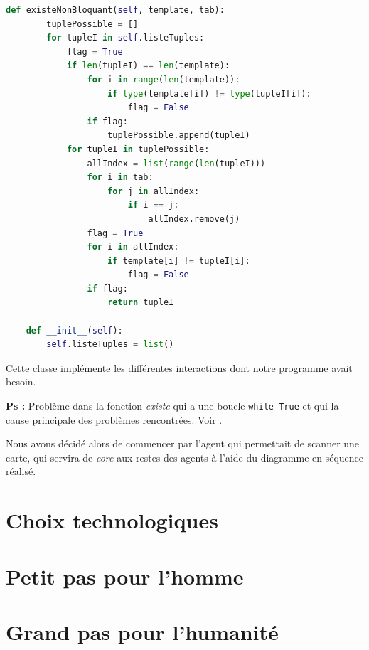 \documentclass[a4paper,10pt]{article}
\begin{document}
\begin{lstlisting}[language=Python]
    def existeNonBloquant(self, template, tab):
        tuplePossible = []
        for tupleI in self.listeTuples:
            flag = True
            if len(tupleI) == len(template):
                for i in range(len(template)):
                    if type(template[i]) != type(tupleI[i]):
                        flag = False
                if flag:
                    tuplePossible.append(tupleI)
            for tupleI in tuplePossible:
                allIndex = list(range(len(tupleI)))
                for i in tab:
                    for j in allIndex:
                        if i == j:
                            allIndex.remove(j)
                flag = True
                for i in allIndex:
                    if template[i] != tupleI[i]:
                        flag = False
                if flag:
                    return tupleI

    def __init__(self):
        self.listeTuples = list()

    \end{lstlisting}
    Cette classe implémente les différentes interactions dont notre programme avait besoin. 

    \textbf{Ps : } Problème dans la fonction \textit{existe} qui a une boucle \verb|while True| et qui la cause principale des problèmes rencontrées. Voir .

    \pagebreak
    Nous avons décidé alors de commencer par l'agent qui permettait de scanner une carte, qui servira de \textit{core} aux restes des agents à l'aide du diagramme en séquence réalisé.

    \pagebreak
    \section{Choix technologiques}
    \pagebreak
    \section{Petit pas pour l'homme}
    \pagebreak
    \section{Grand pas pour l'humanité}
    \pagebreak
\end{document}
